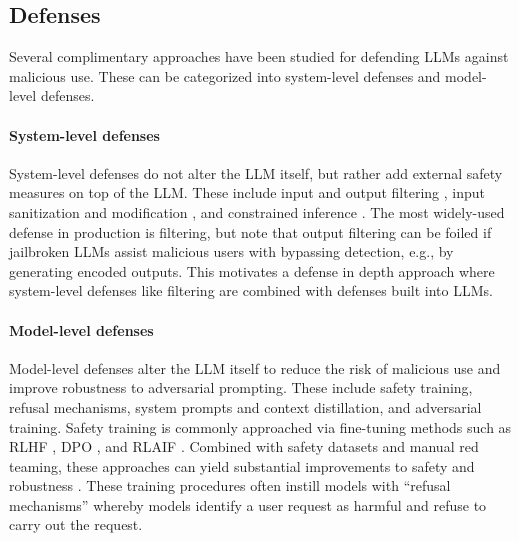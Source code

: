 \subsection{Defenses}

Several complimentary approaches have been studied for defending LLMs against malicious use. These can be categorized into system-level defenses and model-level defenses.

\paragraph{System-level defenses}
System-level defenses do not alter the LLM itself, but rather add external safety measures on top of the LLM. These include input and output filtering \citep{markov2023holistic, inan2023llama, openchatkit, li2023rain, cao2023defending, jain2023baseline}, input sanitization \citep{jain2023baseline} and modification \citep{Zhou2024RobustPO}, and constrained inference \citep{rebedea2023nemo}. The most widely-used defense in production is filtering, but \citet{glukhov2023llm} note that output filtering can be foiled if jailbroken LLMs assist malicious users with bypassing detection, e.g., by generating encoded outputs. This motivates a defense in depth approach where system-level defenses like filtering are combined with defenses built into LLMs.











\paragraph{Model-level defenses}
Model-level defenses alter the LLM itself to reduce the risk of malicious use and improve robustness to adversarial prompting. These include safety training, refusal mechanisms, system prompts and context distillation, and adversarial training. Safety training is commonly approached via fine-tuning methods such as RLHF \citep{ouyang2022training}, DPO \citep{rafailov2023direct}, and RLAIF \citep{bai2022constitutional}. Combined with safety datasets and manual red teaming, these approaches can yield substantial improvements to safety and robustness \citep{bai2022training, achiam2023gpt, touvron2023llama}. These training procedures often instill models with ``refusal mechanisms'' whereby models identify a user request as harmful and refuse to carry out the request.

